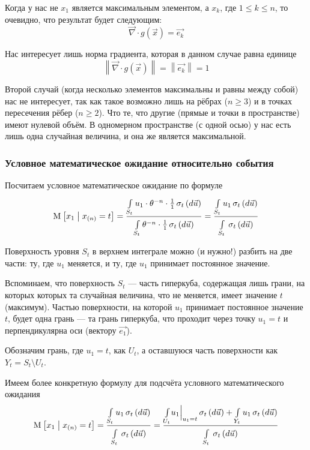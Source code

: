Когда у нас не $x_1$ является максимальным элементом, а $x_k$,
где $1 \le k \le n$, то очевидно, что результат будет следующим:
$$\vec{\nabla} \cdot g\left( \vec{x} \right) = \vec{e_k}$$

Нас интересует лишь норма градиента, которая в данном случае равна единице
$$\left\| \vec{\nabla} \cdot g\left( \vec{x} \right) \right\|
  = \left\| \vec{e_k} \right\| = 1$$

Второй случай (когда несколько элементов максимальны и равны между собой)
нас не интересует, так как такое возможно лишь на рёбрах ($n \ge 3$) и в точках
пересечения рёбер ($n \ge 2$).
Что те, что другие (прямые и точки в пространстве) имеют нулевой объём.
В одномерном пространстве (с одной осью) у нас есть лишь одна
случайная величина, и она же является максимальной.

\subsubsection{Условное математическое ожидание относительно события}
Посчитаем условное математическое ожидание по формуле
\begin{align*}
  \Mean{x_1 \mcond x_{\left( n \right)} = t}
      = \frac{\integrall{S_t}{
    \sigma_{t}\left(d\vec{u} \right)}{
    u_1 \cdot \theta^{-n} \cdot \frac{1}{1}}}
      {\integrall{S_t}{\sigma_{t}\left(d\vec{u} \right)}{
    \theta^{-n} \cdot \frac{1}{1}}}
      = \frac{\integrall{S_t}{
    \sigma_{t}\left(d\vec{u} \right)}{u_1}}{
      \integrall{S_t}{
    \sigma_{t}\left(d\vec{u} \right)}{}}
\end{align*}

Поверхность уровня $S_t$ в верхнем интеграле можно (и нужно!)
разбить на две части: ту, где $u_1$ меняется, и ту, где $u_1$
принимает постоянное значение.

Вспоминаем, что поверхность $S_t$ --- часть гиперкуба,
содержащая лишь грани, на которых которых та случайная величина,
что не меняется, имеет значение $t$ (максимум).
Частью поверхности, на которой $u_1$ принимает постоянное значение $t$,
будет одна грань --- та грань гиперкуба, что проходит через точку $u_1 = t$
и перпендикулярна оси (вектору $\vec{e_1}$).

Обозначим грань, где $u_1 = t$, как $U_t$,
а оставшуюся часть поверхности как $Y_t = S_t \setminus U_t$.

Имеем более конкретную формулу для подсчёта условного математического ожидания
\begin{align*}
  \Mean{x_1 \mcond x_{\left( n \right)} = t}
  = \frac{\integrall{S_t}{\sigma_{t}\left(d\vec{u} \right)}{u_1}}{
      \integrall{S_t}{\sigma_{t}\left(d\vec{u} \right)}{}}
  = \frac{\integrall{U_t}{\sigma_{t}\left(d\vec{u} \right)}{
      \Bigl. u_1 \Bigr|_{u_1 = t}}
      + \integrall{Y_t}{\sigma_{t}\left(d\vec{u} \right)}{
      u_1}}{
      \integrall{S_t}{\sigma_{t}\left(d\vec{u} \right)}{}}
\end{align*}

